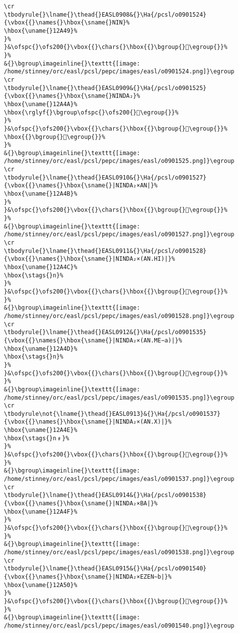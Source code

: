 \begin{verbatim}
\cr
\tbodyrule{}\lname{}\thead{}EASL0908&{}\Ha{/pcsl/o0901524}{\vbox{{}\names{}\hbox{\sname{}NIN}%
\hbox{\uname{}12A49}%
}%
}&\ofspc{}\ofs200{}\vbox{{}\chars{}\hbox{{}\bgroup{}𒩉\egroup{}}%
}%
&{}\bgroup\imageinline{}\texttt{[image: /home/stinney/orc/easl/pcsl/pepc/images/easl/o0901524.png]}\egroup
\cr
\tbodyrule{}\lname{}\thead{}EASL0909&{}\Ha{/pcsl/o0901525}{\vbox{{}\names{}\hbox{\sname{}NINDA₂}%
\hbox{\uname{}12A4A}%
\hbox{\rglyf{}\bgroup\ofspc{}\ofs200{}𒩊\egroup{}}%
}%
}&\ofspc{}\ofs200{}\vbox{{}\chars{}\hbox{{}\bgroup{}𒩧\egroup{}}%
\hbox{{}\bgroup{}𒩊\egroup{}}%
}%
&{}\bgroup\imageinline{}\texttt{[image: /home/stinney/orc/easl/pcsl/pepc/images/easl/o0901525.png]}\egroup
\cr
\tbodyrule{}\lname{}\thead{}EASL0910&{}\Ha{/pcsl/o0901527}{\vbox{{}\names{}\hbox{\sname{}|NINDA₂×AN|}%
\hbox{\uname{}12A4B}%
}%
}&\ofspc{}\ofs200{}\vbox{{}\chars{}\hbox{{}\bgroup{}𒩋\egroup{}}%
}%
&{}\bgroup\imageinline{}\texttt{[image: /home/stinney/orc/easl/pcsl/pepc/images/easl/o0901527.png]}\egroup
\cr
\tbodyrule{}\lname{}\thead{}EASL0911&{}\Ha{/pcsl/o0901528}{\vbox{{}\names{}\hbox{\sname{}|NINDA₂×(AN.HI)|}%
\hbox{\uname{}12A4C}%
\hbox{\stags{}n}%
}%
}&\ofspc{}\ofs200{}\vbox{{}\chars{}\hbox{{}\bgroup{}𒩌\egroup{}}%
}%
&{}\bgroup\imageinline{}\texttt{[image: /home/stinney/orc/easl/pcsl/pepc/images/easl/o0901528.png]}\egroup
\cr
\tbodyrule{}\lname{}\thead{}EASL0912&{}\Ha{/pcsl/o0901535}{\vbox{{}\names{}\hbox{\sname{}|NINDA₂×(AN.ME∼a)|}%
\hbox{\uname{}12A4D}%
\hbox{\stags{}n}%
}%
}&\ofspc{}\ofs200{}\vbox{{}\chars{}\hbox{{}\bgroup{}𒩍\egroup{}}%
}%
&{}\bgroup\imageinline{}\texttt{[image: /home/stinney/orc/easl/pcsl/pepc/images/easl/o0901535.png]}\egroup
\cr
\tbodyrule\not{\lname{}\thead{}EASL0913}&{}\Ha{/pcsl/o0901537}{\vbox{{}\names{}\hbox{\sname{}|NINDA₂×(AN.X)|}%
\hbox{\uname{}12A4E}%
\hbox{\stags{}n﹟}%
}%
}&\ofspc{}\ofs200{}\vbox{{}\chars{}\hbox{{}\bgroup{}𒩎\egroup{}}%
}%
&{}\bgroup\imageinline{}\texttt{[image: /home/stinney/orc/easl/pcsl/pepc/images/easl/o0901537.png]}\egroup
\cr
\tbodyrule{}\lname{}\thead{}EASL0914&{}\Ha{/pcsl/o0901538}{\vbox{{}\names{}\hbox{\sname{}|NINDA₂×BA|}%
\hbox{\uname{}12A4F}%
}%
}&\ofspc{}\ofs200{}\vbox{{}\chars{}\hbox{{}\bgroup{}𒩏\egroup{}}%
}%
&{}\bgroup\imageinline{}\texttt{[image: /home/stinney/orc/easl/pcsl/pepc/images/easl/o0901538.png]}\egroup
\cr
\tbodyrule{}\lname{}\thead{}EASL0915&{}\Ha{/pcsl/o0901540}{\vbox{{}\names{}\hbox{\sname{}|NINDA₂×EZEN∼b|}%
\hbox{\uname{}12A50}%
}%
}&\ofspc{}\ofs200{}\vbox{{}\chars{}\hbox{{}\bgroup{}𒩐\egroup{}}%
}%
&{}\bgroup\imageinline{}\texttt{[image: /home/stinney/orc/easl/pcsl/pepc/images/easl/o0901540.png]}\egroup

\end{verbatim}
